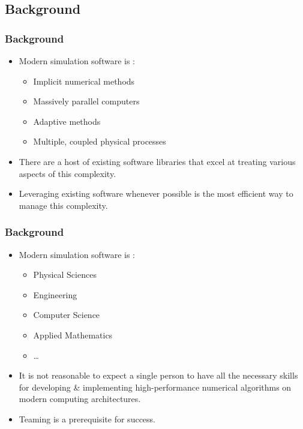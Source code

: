 

%




\subsection{Background}
\frame
{
  \frametitle{Background}

  \begin{itemize}
  \item Modern simulation software is :
    \begin{itemize}
    \item Implicit numerical methods
    \item Massively parallel computers
    \item Adaptive methods
    \item Multiple, coupled physical processes
    \end{itemize}
  \item There are a host of existing software libraries that excel at treating various aspects of this complexity.
  \item Leveraging existing software whenever possible is the most efficient way to manage this complexity.

  \end{itemize}
}




\frame
{
  \frametitle{Background}

  \begin{itemize}
  \item Modern simulation software is :
    \begin{itemize}
    \item Physical Sciences
    \item Engineering
    \item Computer Science
    \item Applied Mathematics
    \item \ldots
    \end{itemize}
  \item It is not reasonable to expect a single person to have all the necessary skills for developing \& implementing high-performance numerical algorithms on modern computing architectures.
  \item Teaming is a prerequisite for success.
  \end{itemize}
}


